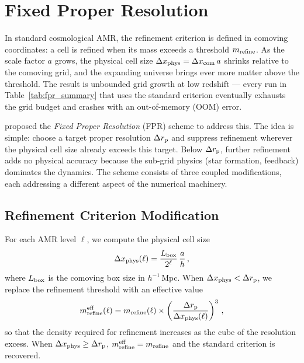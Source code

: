 \documentclass[fleqn,usenatbib]{mnras}
\newcommand{\dx}{\Delta x}
\newcommand{\drp}{\Delta r_{\rm p}}
\newcommand{\dxp}{\Delta x_{\rm phys}}
\begin{document}
\section{Fixed Proper Resolution}
\label{sec:fpr}

In standard cosmological AMR, the refinement criterion is defined in
comoving coordinates: a cell is refined when its mass exceeds a
threshold $m_{\rm refine}$.  As the scale factor $a$ grows, the
physical cell size $\dxp = \dx_{\rm com}\,a$ shrinks relative to the
comoving grid, and the expanding universe brings ever more matter
above the threshold.  The result is unbounded grid growth at low
redshift --- every run in Table~\ref{tab:fpr_summary} that uses the
standard criterion eventually exhausts the grid budget and crashes
with an out-of-memory (OOM) error.

\citet{Gnedin2016} proposed the \emph{Fixed Proper Resolution} (FPR)
scheme to address this.  The idea is simple: choose a target proper
resolution $\drp$ and suppress refinement wherever the physical cell
size already exceeds this target.  Below $\drp$, further refinement
adds no physical accuracy because the sub-grid physics (star
formation, feedback) dominates the dynamics.  The scheme consists of
three coupled modifications, each addressing a different aspect of the
numerical machinery.

\subsection{Refinement Criterion Modification}
\label{sec:fpr_refine}

For each AMR level $\ell$, we compute the physical cell size
\begin{equation}
  \dxp(\ell) = \frac{L_{\rm box}}{2^\ell}\,\frac{a}{h}\,,
  \label{eq:dx_phys}
\end{equation}
where $L_{\rm box}$ is the comoving box size in $h^{-1}\,$Mpc.  When
$\dxp < \drp$, we replace the refinement threshold with an effective
value
\begin{equation}
  m_{\rm refine}^{\rm eff}(\ell) = m_{\rm refine}(\ell)
  \times \left(\frac{\drp}{\dxp(\ell)}\right)^3\,,
  \label{eq:m_refine_eff}
\end{equation}
so that the density required for refinement increases as the cube of
the resolution excess.  When $\dxp \ge \drp$, $m_{\rm refine}^{\rm
eff} = m_{\rm refine}$ and the standard criterion is recovered.
\end{document}
